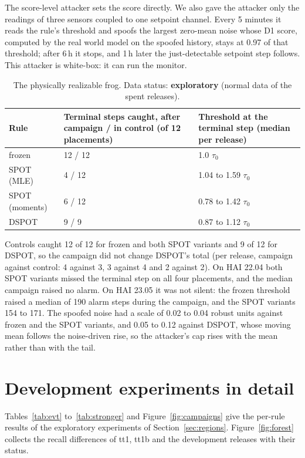 \documentclass[letterpaper,twocolumn,10pt]{article}
\begin{document}
The score-level attacker sets the score directly. We also gave the attacker only the readings of
three sensors coupled to one setpoint channel. Every 5 minutes it reads the rule's threshold and
spoofs the largest zero-mean noise whose D1 score, computed by the real world model on the spoofed
history, stays at 0.97 of that threshold; after 6\,h it stops, and 1\,h later the just-detectable
setpoint step follows. This attacker is white-box: it can run the monitor.

\begin{table}[t]
\caption{The physically realizable frog. Data status: \textbf{exploratory} (normal data of the spent
releases).}
\label{tab:physfrog}
\small
\begin{tabular}{@{}p{}p{}p{}@{}}
\toprule
Rule & Terminal steps caught, after campaign / in control (of 12 placements) & Threshold at the terminal step (median per release) \\
\midrule
frozen & 12 / 12 & 1.0 $\tau_0$ \\
SPOT (MLE) & 4 / 12 & 1.04 to 1.59 $\tau_0$ \\
SPOT (moments) & 6 / 12 & 0.78 to 1.42 $\tau_0$ \\
DSPOT & 9 / 9 & 0.87 to 1.12 $\tau_0$ \\
\bottomrule
\end{tabular}
\end{table}

Controls caught 12 of 12 for frozen and both SPOT variants and 9 of 12 for DSPOT, so the campaign did not change DSPOT's total (per release, campaign against control: 4 against 3, 3 against 4 and 2 against 2). On HAI 22.04 both SPOT variants missed the terminal step on all four placements, and the median campaign raised no alarm. On HAI 23.05 it was not silent: the frozen threshold raised a median of
190 alarm steps during the campaign, and the SPOT variants 154 to 171. The
spoofed noise had a scale of 0.02 to 0.04 robust units against frozen and the SPOT variants, and 0.05
to 0.12 against DSPOT, whose moving mean follows the noise-driven rise, so the attacker's cap rises
with the mean rather than with the tail.

\section{Development experiments in detail}
\label{app:dev}

Tables~\ref{tab:evt} to~\ref{tab:stronger} and Figure~\ref{fig:campaigns} give the per-rule results of
the exploratory experiments of Section~\ref{sec:regions}. Figure~\ref{fig:forest} collects the recall differences of tt1, tt1b and
the development releases with their status.
\end{document}
